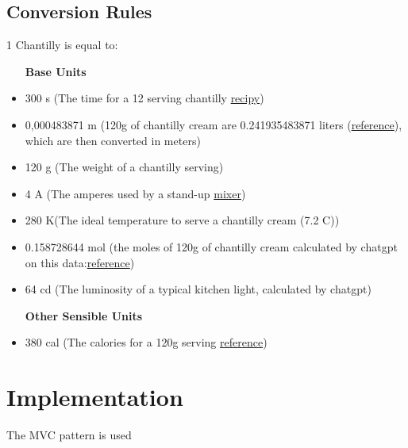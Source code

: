 \documentclass[12pt, a4paper]{report}
\begin{document}
\section{Conversion Rules}
1 Chantilly is equal to:
\begin{itemize}
    \item [\textbf{Base Units}]
    \item 300 s (The time for a 12 serving chantilly \href{https://www.thespruceeats.com/vanilla-chantilly-cream-recipe-1375640}{recipy})
    \item 0,000483871 m (120g of chantilly cream are 0.241935483871 liters (\href{https://www.inchcalculator.com/convert/gram-to-liter/}{reference}), which are then converted in meters)
    \item 120 g (The weight of a chantilly serving)
    \item 4 A (The amperes used by a stand-up \href{https://anationofmoms.com/2023/04/stand-up-mixer-amps.html}{mixer})
    \item 280 K\textdegree (The ideal temperature to serve a chantilly cream (7.2 C\textdegree))
    \item 0.158728644 mol (the moles of 120g of chantilly cream calculated by chatgpt on this data:\href{https://www.fatsecret.com/calories-nutrition/generic/chantilly-cream?portionid=49910&portionamount=100.000&frc=True}{reference})
    \item 64 cd (The luminosity of a typical kitchen light, calculated by chatgpt)
\end{itemize}
\begin{itemize}
    \item [\textbf{Other Sensible Units}]
    \item 380 cal (The calories for a 120g serving \href{https://www.fatsecret.com/calories-nutrition/generic/chantilly-cream?portionid=49910&portionamount=100.000&frc=True}{reference})
\end{itemize}

\chapter{Implementation}
The MVC pattern is used



\end{document}
